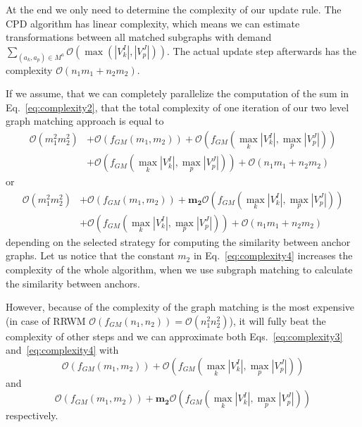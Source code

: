 At the end we only need to determine the complexity of our update rule. The CPD algorithm has linear complexity, which means we can estimate transformations between all matched subgraphs with demand $\sum_{(a_k,a_p)\in M^a}\mathcal{O}(\max(|V^I_k|,|V^J_p|))$. The actual update step afterwards has the complexity $\mathcal{O}(n_1m_1+n_2m_2)$.

If we assume, that we can completely parallelize the computation of the sum in Eq.~\eqref{eq:complexity2}, that the total complexity of one iteration of our two level graph matching approach is equal to
\begin{equation}\label{eq:complexity3}
\begin{split}
\mathcal{O}(m_1^2m_2^2)&+\mathcal{O}(f_{GM}(m_1,m_2))+\mathcal{O}(f_{GM}(\max_{k}|V^I_k|,\max_{p}|V^J_p|))\\
                       &+\mathcal{O}(f_{GM}(\max_{k}|V^I_k|,\max_{p}|V^J_p|))+\mathcal{O}(n_1m_1+n_2m_2)
\end{split}
\end{equation}
or
\begin{equation}\label{eq:complexity4}
\begin{split}
\mathcal{O}(m_1^2m_2^2)&+\mathcal{O}(f_{GM}(m_1,m_2))+\mathbf{m_2}\mathcal{O}(f_{GM}(\max_{k}|V^I_k|,\max_{p}|V^J_p|))\\
&+\mathcal{O}(f_{GM}(\max_{k}|V^I_k|,\max_{p}|V^J_p|))+\mathcal{O}(n_1m_1+n_2m_2)
\end{split}
\end{equation}
depending on the selected strategy for computing the similarity between anchor graphs. Let us notice that the constant $m_2$ in Eq.~\eqref{eq:complexity4} increases the complexity of the whole algorithm, when we use subgraph matching to calculate the similarity between anchors.

However, because of the complexity of the graph matching is the most expensive (in case of RRWM $\mathcal{O}(f_{GM}(n_1,n_2))=\mathcal{O}(n_1^2n_2^2)$), it will fully beat the complexity of other steps and we can approximate both Eqs.~\eqref{eq:complexity3} and~\eqref{eq:complexity4} with
\begin{equation}\label{eq:complexity3.1}
\mathcal{O}(f_{GM}(m_1,m_2))+\mathcal{O}(f_{GM}(\max_{k}|V^I_k|,\max_{p}|V^J_p|))
\end{equation} 
and 
\begin{equation}\label{eq:complexity4.1}
\mathcal{O}(f_{GM}(m_1,m_2))+\mathbf{m_2}\mathcal{O}(f_{GM}(\max_{k}|V^I_k|,\max_{p}|V^J_p|))
\end{equation}
respectively.

